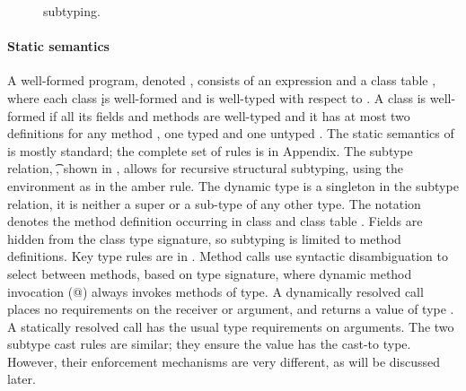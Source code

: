 \documentclass[a4paper,USenglish]{tex/lipics-v2016}
\begin{document}
\begin{figure}[!b] \hrulefill\small

\vspace{-2mm}

\begin{mathpar}

\hspace{-8mm}


\hspace{-8mm}

\end{mathpar}

\hrulefill\caption{\kafka subtyping.}\label{sub}%
\end{figure}


\paragraph{Static semantics} A well-formed program, denoted \WFp\e\K, consists
of an expression \e and a class table \K, where each class \k is well-formed
and \e is well-typed with respect to \K.  A class is well-formed if all its
fields and methods are well-typed and it has at most two definitions for any
method \m, one typed \Mdef\m\x\C\D\e and one untyped \Mdef\m\x\any\any\e.  The
static semantics of \kafka is mostly standard; the complete set of rules is in
Appendix.  The subtype relation, \StrSub\M\K\t\tp, shown in
, allows for recursive structural subtyping, using the environment
\M as in the amber rule.  The dynamic type \any is a singleton in the subtype
relation, it is neither a super or a sub-type of any other type.  The notation
\md\In\App\K\C denotes the method definition \md occurring in class \C and
class table \K.  Fields are hidden from the class type signature, so
subtyping is limited to method definitions.  Key type rules are in
.  Method calls use syntactic disambiguation to select
between methods, based on type signature, where dynamic method invocation (@)
always invokes methods of type\any. A dynamically resolved call places no
requirements on the receiver or argument, and returns a value of type \any.  A
statically resolved call has the usual type requirements on arguments. The two
subtype cast rules are similar; they ensure the value has the cast-to type.
However, their enforcement mechanisms are very different, as will be discussed
later.
\end{document}
